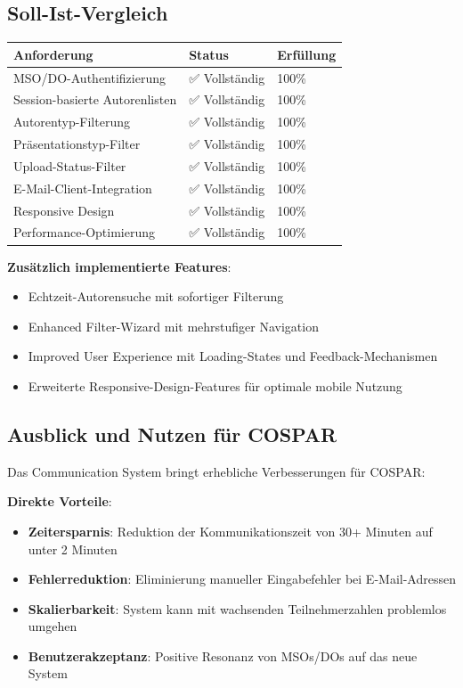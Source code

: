 \documentclass[11pt,a4paper]{article}
\begin{document}
\subsection{Soll-Ist-Vergleich}
\begin{center}
\begin{tabular}{|l|l|l|}
\hline
\textbf{Anforderung} & \textbf{Status} & \textbf{Erfüllung} \\
\hline
MSO/DO-Authentifizierung & ✅ Vollständig & 100\% \\
\hline
Session-basierte Autorenlisten & ✅ Vollständig & 100\% \\
\hline
Autorentyp-Filterung & ✅ Vollständig & 100\% \\
\hline
Präsentationstyp-Filter & ✅ Vollständig & 100\% \\
\hline
Upload-Status-Filter & ✅ Vollständig & 100\% \\
\hline
E-Mail-Client-Integration & ✅ Vollständig & 100\% \\
\hline
Responsive Design & ✅ Vollständig & 100\% \\
\hline
Performance-Optimierung & ✅ Vollständig & 100\% \\
\hline
\end{tabular}
\end{center}

\textbf{Zusätzlich implementierte Features}:
\begin{itemize}
    \item Echtzeit-Autorensuche mit sofortiger Filterung
    \item Enhanced Filter-Wizard mit mehrstufiger Navigation
    \item Improved User Experience mit Loading-States und Feedback-Mechanismen
    \item Erweiterte Responsive-Design-Features für optimale mobile Nutzung
\end{itemize}

\subsection{Ausblick und Nutzen für COSPAR}
Das Communication System bringt erhebliche Verbesserungen für COSPAR:

\textbf{Direkte Vorteile}:
\begin{itemize}
    \item \textbf{Zeitersparnis}: Reduktion der Kommunikationszeit von 30+ Minuten auf unter 2 Minuten
    \item \textbf{Fehlerreduktion}: Eliminierung manueller Eingabefehler bei E-Mail-Adressen
    \item \textbf{Skalierbarkeit}: System kann mit wachsenden Teilnehmerzahlen problemlos umgehen
    \item \textbf{Benutzerakzeptanz}: Positive Resonanz von MSOs/DOs auf das neue System
\end{itemize}
\end{document}
